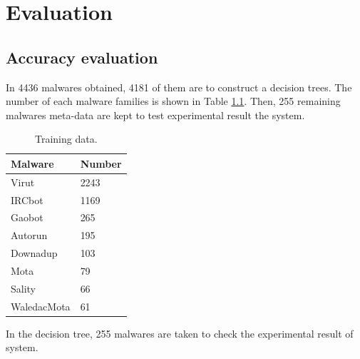 \chapter{Evaluation}\label{chap:6}


\section{Accuracy evaluation}

In 4436 malwares obtained, 4181 of them are to construct a decision trees. The number of each malware families is shown in Table \ref{table:trainingdata}. Then, 255 remaining malwares meta-data are kept to test experimental result the system.
\begin{table}
  \begin{center}
    \begin{tabular}{ | l | l |}
     \hline
    Malware & Number\\ \hline
    Virut & 2243\\ \hline
	IRCbot & 1169\\ \hline
	Gaobot  & 265\\ \hline
	Autorun & 195\\ \hline
	Downadup &  103\\ \hline
	Mota & 79\\ \hline
	Sality  & 66  \\ \hline
	WaledacMota & 61\\ \hline
    \end{tabular}
	\end{center}
     \caption{Training data.}
      \label{table:trainingdata}
\end{table}

In the decision tree, 255 malwares are taken to check the experimental result of system. 

